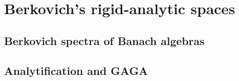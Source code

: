 \section{Berkovich's rigid-analytic spaces}
    \subsection{Berkovich spectra of Banach algebras}
    
    \subsection{Analytification and GAGA}